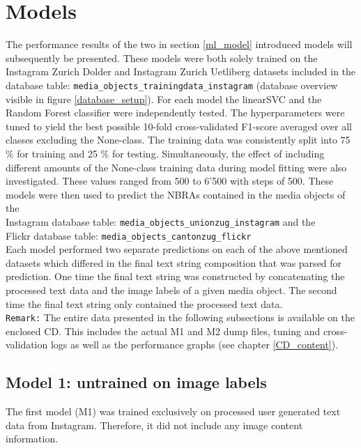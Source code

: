 \section{Models} \label{results_models}
The performance results of the two in section \ref{ml_model} introduced models will subsequently be presented. These models were both solely trained on the Instagram Zurich Dolder and Instagram Zurich Uetliberg datasets included in the database table: \texttt{media\_objects\_trainingdata\_instagram} (database overview visible in figure \ref{database_setup}). For each model the linearSVC and the Random Forest classifier were independently tested. The hyperparameters were tuned to yield the best possible 10-fold cross-validated F1-score averaged over all classes excluding the None-class. The training data was consistently split into 75 \% for training and 25 \% for testing. Simultaneously, the effect of including different amounts of the None-class training data during model fitting were also investigated. These values ranged from 500 to 6'500 with steps of 500. These models were then used to predict the NBRAs contained in the media objects of the \\ Instagram database table: \texttt{media\_objects\_unionzug\_instagram} and the \\Flickr database table: \texttt{media\_objects\_cantonzug\_flickr}\\

Each model performed two separate predictions on each of the above mentioned datasets which differed in the final text string composition that was parsed for prediction. One time the final text string was constructed by concatenating the processed text data and the image labels of a given media object. The second time the final text string only contained the processed text data.\\
\newline
\texttt{Remark:} The entire data presented in the following subsections is available on the enclosed CD. This includes the actual M1 and M2 dump files, tuning and cross-validation logs as well as the performance graphs (see chapter \ref{CD_content}).

\subsection{Model 1: untrained on image labels}
The first model (M1) was trained exclusively on processed user generated text data from Instagram. Therefore, it did not include any image content information.

